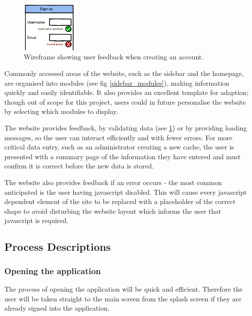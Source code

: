 \begin{figure}
	\vspace{-20pt}
	\begin{center}
	\includegraphics[width=0.25\textwidth]{images/sign_up_wireframe}
	\caption{Wireframe showing user feedback when creating an account.}
	\label{sign_up_wireframe}
	\end{center}
	\vspace{-50pt}
\end{figure}

Commonly accessed areas of the website, such as the sidebar and the homepage, are organised into modules (see fig \ref{sidebar_modules}), making information quickly and easily identifiable. It also provides an excellent template for adaption; though out of scope for this project, users could in future personalise the website by selecting which modules to display.

The website provides feedback, by validating data (see \ref{sign_up_wireframe}) or by providing loading messages, so the user can interact efficiently and with fewer errors. For more critical data entry, such as an administrator creating a new cache, the user is presented with a summary page of the information they have entered and must confirm it is correct before the new data is stored.

The website also provides feedback if an error occurs - the most common anticipated is the user having javascript disabled. This will cause every javascript dependent element of the site to be replaced with a placeholder of the correct shape to avoid disturbing the website layout which informs the user that javascript is required.

\subsection{Process Descriptions}
\subsubsection{Opening the application}

The process of opening the application will be quick and efficient. Therefore the user will be taken straight to the main screen from the splash screen if they are already signed into the application.

